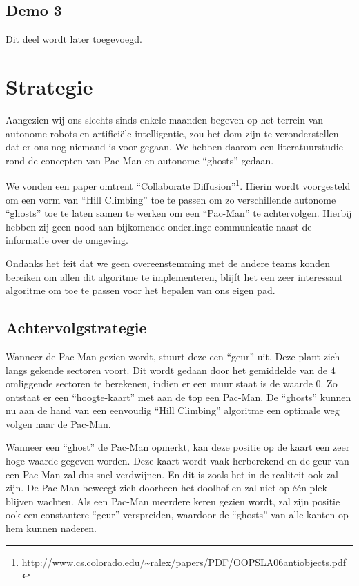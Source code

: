 \documentclass[12pt,a4paper]{report}
\begin{document}
\section{Demo 3}

Dit deel wordt later toegevoegd.

\chapter{Strategie}

Aangezien wij ons slechts sinds enkele maanden begeven op het terrein van autonome robots en artifici\"ele intelligentie, zou het dom zijn te veronderstellen dat er ons nog niemand is voor gegaan. We hebben daarom een literatuurstudie rond de concepten van Pac-Man en autonome ``ghosts'' gedaan.

We vonden een paper omtrent ``Collaborate Diffusion''\footnote{\url{http://www.cs.colorado.edu/~ralex/papers/PDF/OOPSLA06antiobjects.pdf}}. Hierin wordt voorgesteld om een vorm van ``Hill Climbing'' toe te passen om zo verschillende autonome ``ghosts'' toe te laten samen te werken om een ``Pac-Man'' te achtervolgen. Hierbij hebben zij geen nood aan bijkomende onderlinge communicatie naast de informatie over de omgeving.

Ondanks het feit dat we geen overeenstemming met de andere teams konden bereiken om allen dit algoritme te implementeren, blijft het een zeer interessant algoritme om toe te passen voor het bepalen van ons eigen pad.

\section{Achtervolgstrategie}

Wanneer de Pac-Man gezien wordt, stuurt deze een ``geur'' uit. Deze plant zich langs gekende sectoren voort. Dit wordt gedaan door het gemiddelde van de 4 omliggende sectoren te berekenen, indien er een muur staat is de waarde 0. Zo ontstaat er een ``hoogte-kaart'' met aan de top een Pac-Man. De ``ghosts'' kunnen nu aan de hand van een eenvoudig ``Hill Climbing'' algoritme een optimale weg volgen naar de Pac-Man.

Wanneer een ``ghost'' de Pac-Man opmerkt, kan deze positie op de kaart een zeer hoge waarde gegeven worden. Deze kaart wordt vaak herberekend en de geur van een Pac-Man zal dus snel verdwijnen. En dit is zoals het in de realiteit ook zal zijn. De Pac-Man beweegt zich doorheen het doolhof en zal niet op \'e\'en plek blijven wachten. Als een Pac-Man meerdere keren gezien wordt, zal zijn positie ook een constantere ``geur'' verspreiden, waardoor de ``ghosts'' van alle kanten op hem kunnen naderen. 
\end{document}
